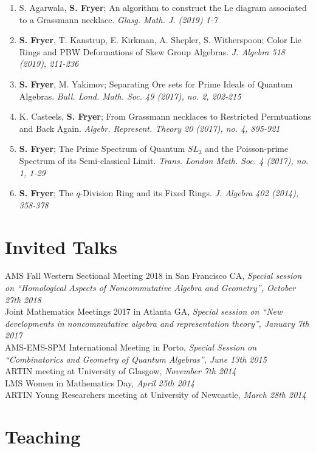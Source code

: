 \documentclass[margin]{res} %
\begin{document}
\begin{resume}
\begin{enumerate}[leftmargin=*]
\item S. Agarwala, {\bf S. Fryer}; An algorithm to construct the Le diagram associated to a Grassmann necklace. {\em Glasg. Math. J. (2019) 1-7}
\item {\bf S. Fryer}, T. Kanstrup, E. Kirkman, A. Shepler, S. Witherspoon; Color Lie Rings and PBW Deformations of Skew Group Algebras. {\em  J. Algebra 518 (2019), 211-236}
\item {\bf S. Fryer}, M. Yakimov; Separating Ore sets for Prime Ideals of Quantum Algebras. {\em Bull. Lond. Math. Soc. 49 (2017), no. 2, 202-215}
\item K. Casteels, {\bf S. Fryer}; From Grassmann necklaces to Restricted Permtuations and Back Again. {\em Algebr. Represent. Theory 20 (2017), no. 4, 895-921}
\item {\bf S. Fryer}; The Prime Spectrum of Quantum $SL_3$ and the Poisson-prime Spectrum of its Semi-classical Limit. {\em Trans. London Math. Soc. 4 (2017), no. 1, 1-29}
\item {\bf S. Fryer}; The $q$-Division Ring and its Fixed Rings. \textit{J. Algebra 402 (2014), 358-378} 

\end{enumerate}


	
\section{\sc Invited Talks}
AMS Fall Western Sectional Meeting 2018 in San Francisco CA, \textit{Special session on ``Homological Aspects of Noncommutative Algebra and Geometry'', October 27th 2018}\\[0.5em]
Joint Mathematics Meetings 2017 in Atlanta GA, \textit{Special session on ``New developments in noncommutative algebra and representation theory'', January 7th 2017}\\[0.5em]
AMS-EMS-SPM International Meeting in Porto, \textit{Special Session on ``Combinatorics and Geometry of Quantum Algebras'', June 13th 2015} \\[0.5em]
ARTIN meeting at University of Glasgow, \textit{November 7th 2014} \\[0.5em]
LMS Women in Mathematics Day, \textit{April 25th 2014} \\[0.5em]
ARTIN Young Researchers meeting at University of Newcastle, \textit{March 28th 2014} 



\section{\sc Teaching}


\end{resume}
\end{document}
